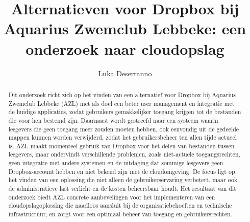 \documentclass{hogent-article}
\title{Alternatieven voor Dropbox bij Aquarius Zwemclub Lebbeke: een onderzoek naar cloudopslag}
\author{Luka Deserranno}
\begin{document}
\begin{abstract}
  Dit onderzoek richt zich op het vinden van een alternatief voor Dropbox bij Aquarius Zwemclub Lebbeke (AZL) met als doel een beter user management en integratie met de huidige applicaties, zodat gebruikers gemakkelijker toegang krijgen tot de bestanden die voor hen bestemd zijn. Daarnaast wordt gestreefd naar een systeem waarin lesgevers die geen toegang meer zouden moeten hebben, ook eenvoudig uit de gedeelde mappen kunnen worden verwijderd, zodat het gebruikersbeheer ten allen tijde actueel is.
  AZL maakt momenteel gebruik van Dropbox voor het delen van bestanden tussen lesgevers, maar ondervindt verschillende problemen, zoals niet-actuele toegangsrechten, geen integratie met andere systemen en de uitdaging dat sommige lesgevers geen Dropbox-account hebben en niet bekend zijn met de cloudomgeving.
  De focus ligt op het vinden van een oplossing die niet alleen de gebruikerservaring verbetert, maar ook de administratieve last verlicht en de kosten beheersbaar houdt. 
  Het resultaat van dit onderzoek biedt AZL concrete aanbevelingen voor het implementeren van een cloudopslagoplossing die naadloos aansluit bij de organisatiebehoeften en technische infrastructuur, en zorgt voor een optimaal beheer van toegang en gebruikersrechten.
\end{abstract}

\tableofcontents



\printbibliography[heading=bibintoc]
\end{document}

